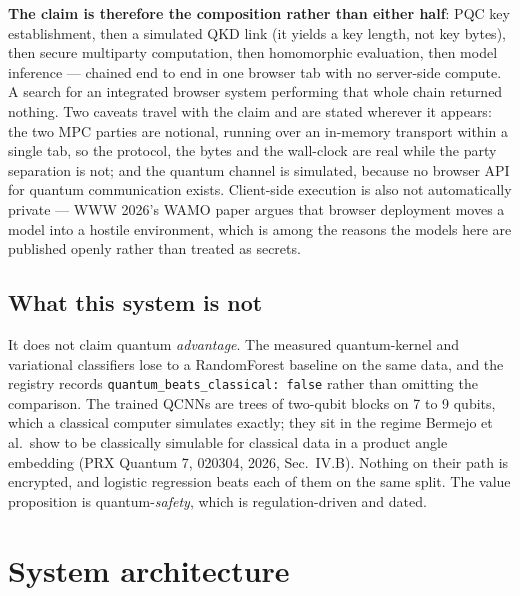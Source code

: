 \documentclass[11pt,a4paper]{article}
\begin{document}
\textbf{The claim is therefore the composition rather than either half}: PQC key establishment, then
a simulated QKD link (it yields a key length, not key bytes), then secure multiparty computation, then
homomorphic evaluation, then model inference --- chained end to end in one browser tab with no server-side compute. A search for an
integrated browser system performing that whole chain returned nothing. Two caveats travel with the
claim and are stated wherever it appears: the two MPC parties are notional, running over an in-memory
transport within a single tab, so the protocol, the bytes and the wall-clock are real while the party
separation is not; and the quantum channel is simulated, because no browser API for quantum
communication exists. Client-side execution is also not automatically private --- WWW 2026's WAMO
paper argues that browser deployment moves a model into a hostile environment, which is among the
reasons the models here are published openly rather than treated as secrets.

\subsection{What this system is not}
It does not claim quantum \emph{advantage}. The measured quantum-kernel and variational classifiers
lose to a RandomForest baseline on the same data, and the registry records
\texttt{quantum\_\allowbreak{}beats\_\allowbreak{}classical: false} rather than omitting the comparison. The trained QCNNs
are trees of two-qubit blocks on 7 to 9 qubits, which a classical computer simulates exactly; they
sit in the regime Bermejo et al.\ show to be classically simulable for classical data in a product
angle embedding (PRX Quantum 7, 020304, 2026, Sec.~IV.B). Nothing on their path is encrypted, and
logistic regression beats each of them on the same split. The value proposition is
quantum-\emph{safety}, which is regulation-driven and dated.

\section{System architecture}
\end{document}
